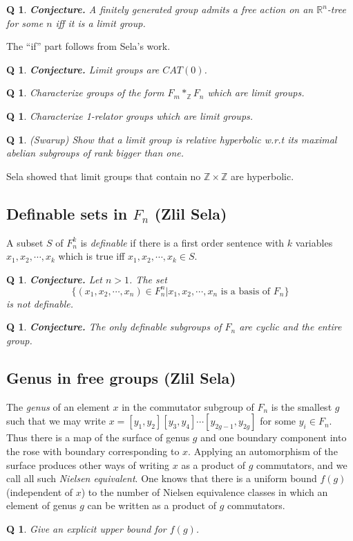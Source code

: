\documentclass[11pt]{article}
\newtheorem{q}[thm]{Q}
\theoremstyle{remark}
\def\b{\begin{q}}
\def\e{\end{q}}
\def\R{{\mathbb R}}
\def\Z{{\mathbb Z}}
\newcommand{\<}{\langle}
\renewcommand{\>}{\rangle}
\begin{document}
\b
{\bf Conjecture.} A finitely generated group admits a free action on an
$\R^n$-tree for some $n$ iff it is a limit group.\e

The ``if'' part follows from Sela's work.

\b
{\bf Conjecture.} Limit groups are $CAT(0)$.\e

\b
Characterize groups of the form $F_m*_\Z F_n$ which are limit
groups. \e

\b
Characterize 1-relator groups which are limit
groups. \e

\b (Swarup)
Show that a limit group is relative hyperbolic w.r.t its maximal 
abelian subgroups of rank bigger than one.\e

Sela showed that limit groups that contain no $\Z\times\Z$ are hyperbolic.

\subsection{Definable sets in $F_n$ (Zlil Sela)}

A subset $S$ of $F_n^k$ is {\it definable} if there is a first order sentence
with $k$ variables $x_1,x_2,\cdots,x_k$ which is true iff
$x_1,x_2,\cdots,x_k\in S$.

\b
{\bf Conjecture.} Let $n>1$. The set $$\{(x_1,x_2,\cdots,x_n)\in
F_n^n|x_1,x_2,\cdots,x_n \text{ is a basis of }F_n\}$$ is not definable.\e

\b
{\bf Conjecture.} The only definable subgroups of $F_n$ are cyclic and the
entire group. \e

\subsection{Genus in free groups (Zlil Sela)}
The {\it genus} of an element $x$ in the commutator subgroup of $F_n$ is the
smallest $g$ such that we may write $x=[y_1,y_2][y_3,y_4]\cdots
[y_{2g-1},y_{2g}]$ for some $y_i\in F_n$. Thus there is a map of the surface
of genus $g$ and one boundary component into the rose with boundary
corresponding to $x$. Applying an automorphism of the surface produces other
ways of writing $x$ as a product of $g$ commutators, and we call all such {\it
  Nielsen  equivalent}. One knows that there is a uniform bound $f(g)$
(independent of $x$) to the number of Nielsen equivalence classes in which an
element of genus $g$ can be written as a product of $g$ commutators.

\b
Give an explicit upper bound for $f(g)$.\e
\end{document}

